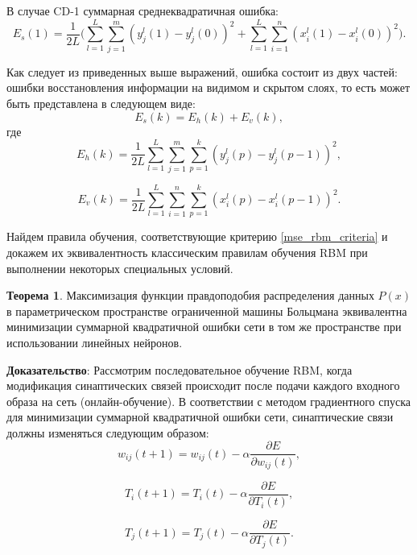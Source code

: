 В случае CD-1  суммарная среднеквадратичная ошибка:
\begin{equation}
    E_s(1)=\frac{1}{2L}\Bigg(\sum_{l=1}^L\sum_{j=1}^m (y_j^l(1)-y_j^l(0))^2+\sum_{l=1}^L\sum_{i=1}^n (x_i^l(1)-x_i^l(0))^2\Bigg).
\end{equation}

Как следует из приведенных выше выражений, ошибка состоит из двух частей: ошибки восстановления информации на видимом и скрытом слоях, то есть может быть представлена в следующем виде:
\begin{equation}
	\label{mse_rbm_criteria}
	E_s(k) = E_h(k) + E_v(k),
\end{equation}
где
\begin{equation}
	E_h(k) = \frac{1}{2L}\sum_{l=1}^L\sum_{j=1}^m\sum_{p=1}^k (y_j^l(p)-y_j^l(p-1))^2,
\end{equation}

\begin{equation}
	E_v(k) = \frac{1}{2L}\sum_{l=1}^L\sum_{i=1}^n\sum_{p=1}^k (x_i^l(p)-x_i^l(p-1))^2.
\end{equation}

Найдем правила обучения, соответствующие критерию \ref{mse_rbm_criteria} и докажем их эквивалентность классическим правилам обучения RBM при выполнении некоторых специальных условий.

\textbf{Теорема 1}. Максимизация функции правдоподобия распределения данных $P(x)$ в параметрическом пространстве ограниченной машины Больцмана эквивалентна минимизации суммарной квадратичной ошибки сети в том же пространстве при использовании линейных нейронов.

\textbf{Доказательство}: Рассмотрим последовательное обучение RBM, когда модификация синаптических связей происходит после подачи каждого входного образа на сеть (онлайн-обучение). В соответствии с методом градиентного спуска для минимизации суммарной квадратичной ошибки сети, синаптические связи должны изменяться следующим образом:	
\begin{equation}
w_{ij}(t+1)=w_{ij}(t)-\alpha\frac{\partial E}{\partial w_{ij}(t)},
\end{equation}		

\begin{equation}
T_{i}(t+1)=T_{i}(t)-\alpha\frac{\partial E}{\partial T_{i}(t)},
\end{equation}		

\begin{equation}
T_{j}(t+1)=T_{j}(t)-\alpha\frac{\partial E}{\partial T_{j}(t)}.
\end{equation}

